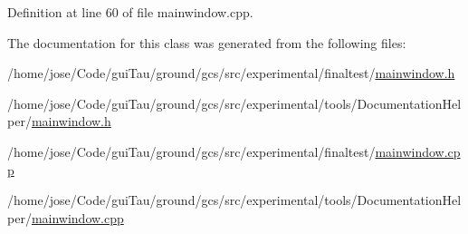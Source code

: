 Definition at line 60 of file mainwindow.\-cpp.



The documentation for this class was generated from the following files\-:\begin{DoxyCompactItemize}
\item 
/home/jose/\-Code/gui\-Tau/ground/gcs/src/experimental/finaltest/\hyperlink{experimental_2finaltest_2mainwindow_8h}{mainwindow.\-h}\item 
/home/jose/\-Code/gui\-Tau/ground/gcs/src/experimental/tools/\-Documentation\-Helper/\hyperlink{experimental_2tools_2_documentation_helper_2mainwindow_8h}{mainwindow.\-h}\item 
/home/jose/\-Code/gui\-Tau/ground/gcs/src/experimental/finaltest/\hyperlink{experimental_2finaltest_2mainwindow_8cpp}{mainwindow.\-cpp}\item 
/home/jose/\-Code/gui\-Tau/ground/gcs/src/experimental/tools/\-Documentation\-Helper/\hyperlink{experimental_2tools_2_documentation_helper_2mainwindow_8cpp}{mainwindow.\-cpp}\end{DoxyCompactItemize}

